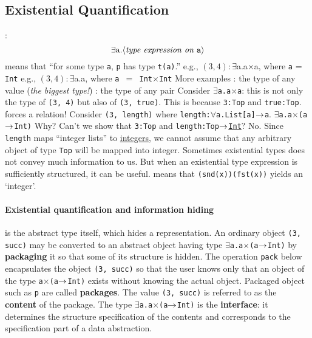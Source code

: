\documentclass{article}
\begin{document}
\subsection{Existential Quantification}
\bit
{}: 
	\[ \mbox{$\exists$a.$\mbox{$\langle{\textit{\mbox{\rm\em{}type expression on {\tt{}a}}}}\rangle$}$}\]
	\bit
	 means that ``for some type {\tt{}a}, 
		{\tt{}p} has type {\tt{}t(a)}.''
	\w e.g., $(3, 4): \exists$a.a$\times$a, where {\tt{}a} = {\tt{}Int}
	\w e.g., $(3, 4): \exists$a.a, where {\tt{}a $=$ Int$\times$Int}
	\eit
\w More examples
	\bit
	: the type of any value ({\em{}the
		biggest type!})
	: the type of any pair
	\eit
{}
	\bit
	\w Consider {\tt{}$\exists$a.a$\times$a}: this is not only the
		type of {\tt{}(3, 4)} but also of {\tt{}(3, true)}.
	\w This is because {\tt{}3:Top} and {\tt{}true:Top}.
	\eit
{} forces a relation!
	\bit
	\w Consider {\tt{}(3, length)} where
		{\tt{}length:$\forall$a.List[a]$\mbox{$\rightarrow$}$a}.
	 {\tt{}$\exists$a.a$\times$(a$\mbox{$\rightarrow$}$Int)}
	\w Why? Can't we show that {\tt{}3:Top} and
		{\tt{}length:Top$\mbox{$\rightarrow$}$\underline{Int}}?
	\w No. Since {\tt{}length} maps ``integer 
		lists'' to \underline{integers}, we 
		cannot assume that any arbitrary object of type 
		{\tt{}Top} will be mapped into integer.
	\eit
\w Sometimes existential types does not convey much information to us.
	\bit
	\w But when an existential type expression is sufficiently 
		structured, it can be useful.
	 means that
		{\tt{}(snd(x))(fst(x))} yields an `integer'.
	\eit
\eit

\paragraph{Existential quantification and information hiding}
\bit
{}
	\bit
	 is the abstract type itself, which hides a representation.
	\eit
\w An ordinary object {\tt{}(3, succ)} may be converted to an abstract object
	having type {\tt{}$\exists$a.a$\times$(a$\mbox{$\rightarrow$}$Int)}
	by {\bf{}packaging} it so that some of its structure is hidden.
	\bit
	\w The operation {\tt{}pack} below encapsulates the object
	{\tt{}(3, succ)} so that the user knows only that an object
	of the type {\tt{}a$\times$(a$\mbox{$\rightarrow$}$Int)} exists without
	knowing the actual object.
       	\w Packaged object such as {\tt{}p} are called {\bf{}packages}.
	\w The value {\tt{}(3, succ)} is referred to as the 
	{\bf{}content} of the package.
	\w The type {\tt{}$\exists$a.a$\times$(a$\mbox{$\rightarrow$}$Int)} is the 
		{\bf{}interface}: it determines the structure specification
		of the contents and corresponds to the specification part 
		of a data abstraction.
	\eit
\eit





\nocite{CW85,FWH92,Sethi89,Scott00}

\tableofcontents
\end{document}
